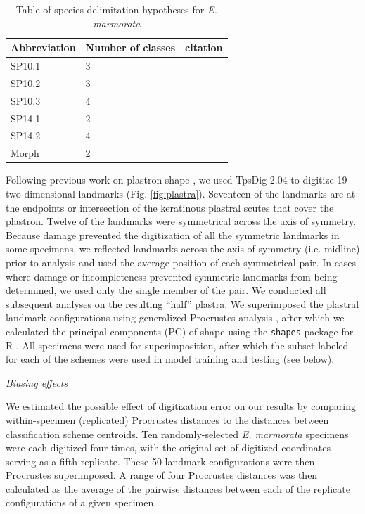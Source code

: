 \documentclass[12pt,letterpaper]{article}
\renewcommand{\subsection}[1]{%
\bigskip
\begin{center}
\begin{large}
\normalfont\itshape #1
\end{large}
\end{center}}
\begin{document}
\begin{table}
  \centering
    \caption{Table of species delimitation hypotheses for \textit{E. marmorata}}
    \begin{tabular}{l l l }
      \hline
      Abbreviation & Number of classes & citation \\
      \hline
      SP10.1 & 3 & \citet{Spinks2010} \\
      SP10.2 & 3 & \citet{Spinks2010} \\
      SP10.3 & 4 & \citet{Spinks2010} \\
      SP14.1 & 2 & \citet{Spinks2014} \\
      SP14.2 & 4 & \citet{Spinks2014} \\
      Morph & 2 & \citet{Spinks2010} \\
      \hline
    \end{tabular}
    \label{tab:hypotheses}
\end{table}

Following previous work on plastron shape \citep{Angielczyk2007,Angielczyk2011,Angielczyk2013a}, we used TpsDig 2.04 \citep{Rohlf2005} to digitize 19 two-dimensional landmarks (Fig. \ref{fig:plastra}). Seventeen of the landmarks are at the endpoints or intersection of the keratinous plastral scutes that cover the plastron. Twelve of the landmarks were symmetrical across the axis of symmetry. Because damage prevented the digitization of all the symmetric landmarks in some specimens, we reflected landmarks across the axis of symmetry (i.e. midline) prior to analysis and used the average position of each symmetrical pair. In cases where damage or incompleteness prevented symmetric landmarks from being determined, we used only the single member of the pair. We conducted all subsequent analyses on the resulting ``half'' plastra. We superimposed the plastral landmark configurations using generalized Procrustes analysis \citep{Dryden1998a}, after which we calculated the principal components (PC) of shape using the \texttt{shapes} package for R \citep{R2016,Dryden2013}. All specimens were used for superimposition, after which the subset labeled for each of the schemes were used in model training and testing (see below).


\subsection{Biasing effects}
We estimated the possible effect of digitization error \citep{Arnqvist1998,Cramon2007,Munoz-MunozF.2010} on our results by comparing within-specimen (replicated) Procrustes distances to the distances between classification scheme centroids. Ten randomly-selected \textit{E. marmorata} specimens were each digitized four times, with the original set of digitized coordinates serving as a fifth replicate. These 50 landmark configurations were then Procrustes superimposed. A range of four Procrustes distances was then calculated as the average of the pairwise distances between each of the replicate configurations of a given specimen.
\end{document}
